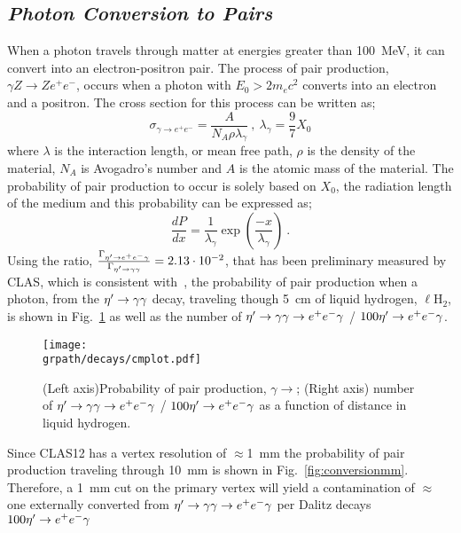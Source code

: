 \subsection{\emph{Photon Conversion to \epemT Pairs}}\label{sec:intro.conversion}
When a photon travels through matter at energies greater than 100~MeV, it can convert into an electron-positron pair. The process of pair production, $\gamma Z \rightarrow Ze^{+}e^{-}$, occurs when a photon with $E_0 > 2 m_e c^2$ converts into an electron and a positron. The cross section for this process can be written as;
\begin{equation}\label{pair_crosssection}
\sigma_{\gamma\rightarrow e^+e^-} =  \frac{A}{N_{A} \rho \lambda_\gamma}  \ ,\ \lambda_\gamma = \frac{9}{7}X_0
\end{equation}
where $\lambda$ is the interaction length, or mean free path, $\rho$ is the density of the material, $N_A$ is Avogadro's number and $A$ is the atomic mass of the material. The probability of pair production to occur is solely based on $X_{0}$, the radiation length of the medium and this probability can be expressed as;
\begin{equation}
\frac{dP}{dx} = \frac{1}{\lambda_\gamma}\exp(\frac{-x}{\lambda_\gamma}) \ .
\end{equation}
%
%
Using the ratio, $\frac{\Gamma_{\eta^{\prime} \to e^+e^- \gamma}}{\Gamma_{\eta^{\prime} \to \gamma \gamma}} = 2.13\cdot 10^{-2}$, that has been preliminary measured by CLAS, which is consistent with~\cite{BESIII}, the probability of pair production when a photon, from the $\eta^{\prime} \to \gamma \gamma$ decay, traveling though 5~cm of liquid hydrogen, $\ell$H$_2$, is shown in Fig.~\ref{fig:conversion} as well as the number of $\eta^{\prime} \to \gamma \gamma \rightarrow e^+e^- \gamma$ / $100 \eta^{\prime} \rightarrow e^+e^- \gamma$. 
\begin{figure}[h!]\begin{center}
		\texttt{[image: \\grpath/decays/cmplot.pdf]}
		\caption[Probability of pair production, $\gamma \to$\epemT, as a function of distance in liquid hydrogen]{\label{fig:conversion}{(Left axis)Probability of pair production, $\gamma \to$\epemT; (Right axis) number of $\eta^{\prime} \to \gamma \gamma \rightarrow e^+e^- \gamma$ / $100 \eta^{\prime} \rightarrow e^+e^- \gamma$ as a function of distance in liquid hydrogen.}}
	\end{center}\end{figure}
	Since CLAS12 has a vertex resolution of $\approx$1~mm the probability of pair production traveling through 10~mm is shown in Fig.~\ref{fig:conversionmm}. Therefore, a 1~mm cut on the primary vertex will yield a contamination of $\approx$ one externally converted \epemT from $\eta^{\prime} \to \gamma \gamma \rightarrow e^+e^- \gamma$ per Dalitz decays $100 \eta^{\prime} \rightarrow e^+e^- \gamma$
